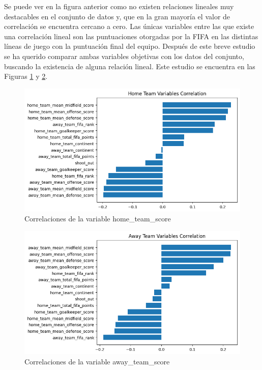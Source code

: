 Se puede ver en la figura anterior como no existen relaciones lineales muy destacables en el conjunto de datos y, que en la gran mayoría el valor de correlación se encuentra cercano a cero. Las únicas variables entre las que existe una correlación lineal son las puntuaciones otorgadas por la FIFA en las distintas líneas de juego con la puntuación final del equipo. Después de este breve estudio se ha querido comparar ambas variables objetivas con los datos del conjunto, buscando la existencia de alguna relación lineal. Este estudio se encuentra en las Figuras \ref{Conjunto-Datos-Home-Correlaciones} y \ref{Conjunto-Datos-Away-Correlaciones}.

\begin{figure}[H]
    \centering
    \includegraphics[width=\figsize]{images/homeTeamCorrelation.png}
    \caption{Correlaciones de la variable home\_team\_score}
    \label{Conjunto-Datos-Home-Correlaciones}
\end{figure}

\begin{figure}[H]
    \centering
    \includegraphics[width=\figsize]{images/awayTeamCorrelation.png}
    \caption{Correlaciones de la variable away\_team\_score}
    \label{Conjunto-Datos-Away-Correlaciones}
\end{figure}

